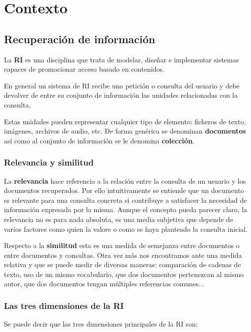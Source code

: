 \chapter{Contexto}


\section{Recuperación de información}
La \textbf{\acrfull{RI}} es una disciplina que trata de modelar, diseñar e implementar sistemas capaces de promocionar acceso basado en contenidos. \cite{RIspaBook}

En general un sistema de \acrshort{RI} recibe una petición o consulta  del usuario y debe devolver de entre su conjunto de información las unidades relacionadas con la consulta. 

Estas unidades pueden representar cualquier tipo de elemento: ficheros de texto, imágenes, archivos de audio, etc. De forma genérica se denominan \textbf{documentos} así como al conjunto de información se le denomina \textbf{colección}.



\subsection{Relevancia y similitud}
La \textbf{relevancia} hace referencia a la relación entre la consulta de un usuario y los documentos recuperados. Por ello intuitivamente se entiende que un documento es relevante para una consulta concreta si contribuye a satisfacer la necesidad de información expresada por la misma. Aunque el concepto pueda parecer claro, la relevancia no es para nada absoluta, es una media subjetiva que depende de varios factores como quien la valore o como se haya planteado la consulta inicial.

Respecto a la \textbf{similitud} esta es una medida de semejanza entre documentos o entre documentos y consultas. Otra vez más nos encontramos ante una medida relativa y que se puede medir de diversas maneras: comparación de cadenas de texto, uso de un mismo vocabulario, que dos documentos pertenezcan al mismo autor, que dos documentos tengan múltiples referencias comunes...\cite{ApuntesRI}


\subsection{Las tres dimensiones de la \acrshort{RI}}
Se puede decir que las tres dimensiones principales de la \acrshort{RI} son:\cite{RIspaBook}


